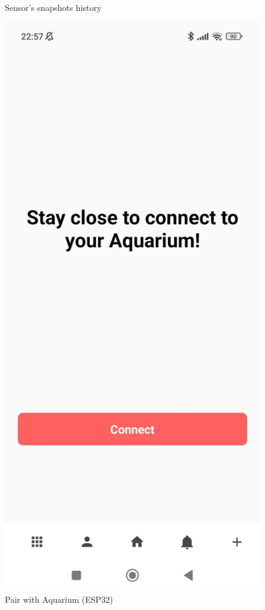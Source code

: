 \documentclass[11pt,a4paper]{article}
\begin{document}
\begin{figure}[H]
\begin{minipage}{0.35\textwidth}
        \caption*{Sensor's snapshots history}
    \end{minipage}
    \hfill
    \begin{minipage}{0.35\textwidth}
        \centering
        \includegraphics[width=\linewidth]{Images/Connect Aquarium.jpeg}
        \caption*{Pair with Aquarium (ESP32)}
    \end{minipage}
\end{figure}
\end{document}
